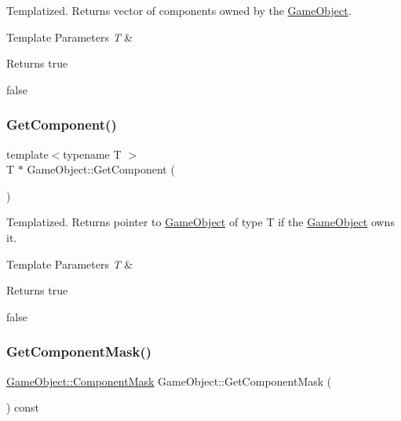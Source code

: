 Templatized. Returns vector of components owned by the \hyperlink{classGameObject}{Game\+Object}. 


\begin{DoxyTemplParams}{Template Parameters}
{\em T} & \\
\hline
\end{DoxyTemplParams}
\begin{DoxyReturn}{Returns}
true 

false 
\end{DoxyReturn}
\mbox{\label{classGameObject_a5ba3b458e6bee6ea5aedd5c8cdeabf18}} 
\subsubsection{\texorpdfstring{Get\+Component()}{GetComponent()}}
{\footnotesize\ttfamily template$<$typename T $>$ \\
T $\ast$ Game\+Object\+::\+Get\+Component (\begin{DoxyParamCaption}{ }\end{DoxyParamCaption})}



Templatized. Returns pointer to \hyperlink{classGameObject}{Game\+Object} of type T if the \hyperlink{classGameObject}{Game\+Object} owns it. 


\begin{DoxyTemplParams}{Template Parameters}
{\em T} & \\
\hline
\end{DoxyTemplParams}
\begin{DoxyReturn}{Returns}
true 

false 
\end{DoxyReturn}
\mbox{\label{classGameObject_aea7bddf2500f760afba95bb9daada51c}} 
\subsubsection{\texorpdfstring{Get\+Component\+Mask()}{GetComponentMask()}}
{\footnotesize\ttfamily \hyperlink{classGameObject_aec670daa4bbc9e2956937b0b1b55acbe}{Game\+Object\+::\+Component\+Mask} Game\+Object\+::\+Get\+Component\+Mask (\begin{DoxyParamCaption}{ }\end{DoxyParamCaption}) const}




